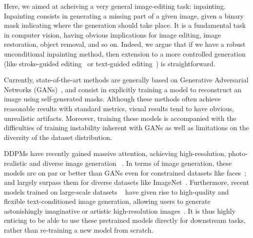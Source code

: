 Here, we aimed at acheiving a very general image-editing task: inpainting.
Inpainting consists in generating a missing part of a given image, given a binary mask 
indicating where the generation should take place. It is a fundamental task in computer
 vision, having obvious implications for image editing, image restoration, object 
 removal, and so on. 
 Indeed, we argue that if we have a robust unconditional 
inpainting method, then extension to a more controlled generation (like stroke-guided editing~\citep{meng2022sdedit} or text-guided editing~\citep{nichol2021glide})
is straightforward. 

Currently, state-of-the-art methods are generally based on 
 Generative Adversarial Networks (GANs)~\citep{lama, zhao2021comodgan}, and consist 
 in explicitly training a model to reconstruct an image using self-generated masks.
  Although these methods often achieve reasonable results with standard metrics, 
  visual results tend to have obvious, unrealistic artifacts. Moreover, training 
  these models is accompanied with the difficulties of training instability inherent 
  with GANs as well as limitations on the diversity of the dataset distribution. 

 \ac{DDPM}s have recently gained massive attention,
  achieving high-resolution, photo-realistic and diverse image generation 
~\citep{ramesh2022hierarchical, saharia2022photorealistic, rombach2022high, latentdiffusion2, nichol2021glide, dhariwal2021diffusion}. In 
  terms of image generation, these models are on par or better than \ac{GAN}s even for 
  constrained datasets like faces~\citep{rombach2022high}; and largely surpass them for 
  diverse datasets like ImageNet~\citep{nichol2021glide, rombach2022high}. Furthermore, 
  recent models trained on large-scale datasets 
~\citep{saharia2022photorealistic, ramesh2022hierarchical, nichol2021glide, gafni2022make, rombach2022high} have given rise to 
  high-quality and flexible text-conditioned image generation, allowing users to 
  generate astonishingly imaginative or artistic high-resolution images~\citep{artcomp}. 
  It is thus highly enticing to be able to use these pretrained models directly for
   downstream tasks, rather than re-training a new model from scratch. 

